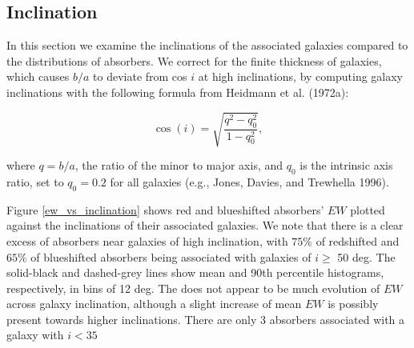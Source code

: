 \documentclass[iop]{emulateapj-rtx4}
\begin{document}
\subsection{Inclination}
In this section we examine the inclinations of the associated galaxies compared to the distributions of absorbers. We correct for the finite thickness of galaxies, which causes $b/a$ to deviate from cos $i$ at high inclinations, by computing galaxy inclinations with the following formula from Heidmann et al. (1972a):

\begin{equation}
	\cos(i) = \sqrt{\frac{q^2 - q_0^2}{1 - q_0^2}},
	\label{incEq}
\end{equation}

\noindent where $q = b/a$, the ratio of the minor to major axis, and $q_0$ is the intrinsic axis ratio, set to $q_0 = 0.2$ for all galaxies (e.g., Jones, Davies, and Trewhella 1996). 



Figure \ref{ew_vs_inclination} shows red and blueshifted absorbers' $EW$ plotted against the inclinations of their associated galaxies. We note that there is a clear excess of absorbers near galaxies of high inclination, with $75\%$ of redshifted and $65\%$ of blueshifted absorbers being associated with galaxies of $i \geq$ 50 deg. The solid-black and dashed-grey lines show mean and 90th percentile histograms, respectively, in bins of 12 deg. The does not appear to be much evolution of $EW$ across galaxy inclination, although a slight increase of mean $EW$ is possibly present towards higher inclinations. There are only 3 absorbers associated with a galaxy with $i<35$ 
\end{document}
